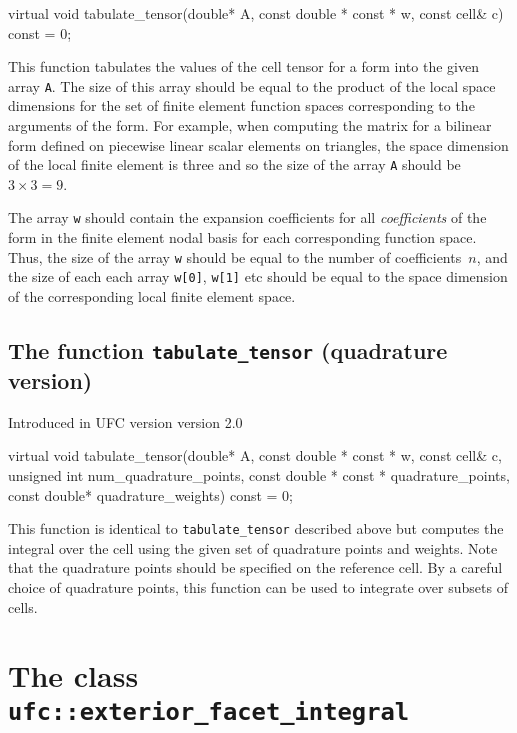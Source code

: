 \begin{code}
virtual void tabulate_tensor(double* A,
                             const double * const * w,
                             const cell& c) const = 0;
\end{code}

This function tabulates the values of the cell tensor for a form into
the given array \texttt{A}. The size of this array should be equal to
the product of the local space dimensions for the set of finite
element function spaces corresponding to the arguments of the
form. For example, when computing the matrix for a bilinear form
defined on piecewise linear scalar elements on triangles, the space dimension
of the local finite element is three and so the size of the array
\texttt{A} should be $3 \times 3 = 9$.

The array \texttt{w} should contain the expansion coefficients for all
\emph{coefficients} of the form in the finite element nodal basis for
each corresponding function space. Thus, the size of the array
\texttt{w} should be equal to the number of coefficients~$n$, and the
size of each each array \texttt{w[0]}, \texttt{w[1]} etc should be
equal to the space dimension of the corresponding local finite element
space.

\subsection{The function \texttt{tabulate\_tensor} (quadrature version)}
Introduced in UFC version version 2.0

\begin{code}
virtual void
tabulate_tensor(double* A,
                const double * const * w,
                const cell& c,
                unsigned int num_quadrature_points,
                const double * const * quadrature_points,
                const double* quadrature_weights) const = 0;
\end{code}

This function is identical to \texttt{tabulate\_tensor} described
above but computes the integral over the cell using the given set of
quadrature points and weights. Note that the quadrature points should
be specified on the reference cell. By a careful choice of quadrature
points, this function can be used to integrate over subsets of cells.

\section{The class \texttt{ufc::exterior\_facet\_integral}}

